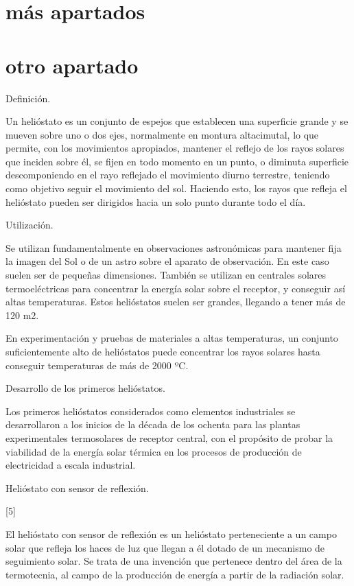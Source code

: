 \documentclass[12pt]{article}
\begin{document}
\section{más apartados}
\section{otro apartado}

Definición.

Un helióstato es un conjunto de espejos que establecen una superficie grande y se mueven sobre uno o dos ejes, normalmente en montura altacimutal, lo que permite, con los movimientos apropiados, mantener el reflejo de los rayos solares que inciden sobre él, se fijen en todo momento en un punto, o diminuta superficie descomponiendo en el rayo reflejado el movimiento diurno terrestre, teniendo como objetivo seguir el movimiento del sol. Haciendo esto, los rayos que refleja el helióstato pueden ser dirigidos hacia un solo punto durante todo el día.


Utilización.

Se utilizan fundamentalmente en observaciones astronómicas para mantener fija la imagen del Sol o de un astro sobre el aparato de observación. En este caso suelen ser de pequeñas dimensiones. También se utilizan en centrales solares termoeléctricas para concentrar la energía solar sobre el receptor, y conseguir así altas temperaturas. Estos helióstatos suelen ser grandes, llegando a tener más de 120 m2.

En experimentación y pruebas de materiales a altas temperaturas, un conjunto suficientemente alto de helióstatos puede concentrar los rayos solares hasta conseguir temperaturas de más de 2000 ºC.


Desarrollo de los primeros helióstatos.

Los primeros helióstatos considerados como elementos industriales se desarrollaron a los inicios de la década de los ochenta para las plantas experimentales termosolares de receptor central, con el propósito de probar la viabilidad de la energía solar térmica en los procesos de producción de electricidad a escala industrial.


Helióstato con sensor de reflexión.

[5]

El helióstato con sensor de reflexión es un helióstato perteneciente a un campo solar que refleja los haces de luz que llegan a él dotado de un mecanismo de seguimiento solar. Se trata de una invención que pertenece dentro del área de la termotecnia, al campo de la producción de energía a partir de la radiación solar.
\end{document}
